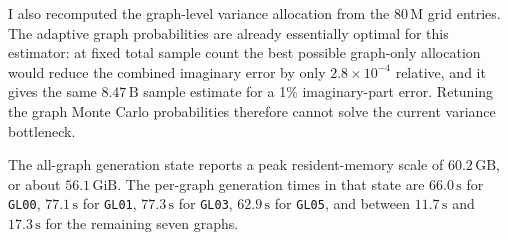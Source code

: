\documentclass[11pt]{article}
\begin{document}
I also recomputed the graph-level variance allocation from the \(80\,\mathrm{M}\)
grid entries.  The adaptive graph probabilities are already essentially
optimal for this estimator: at fixed total sample count the best possible
graph-only allocation would reduce the combined imaginary error by only
\(2.8\times10^{-4}\) relative, and it gives the same \(8.47\,\mathrm{B}\)
sample estimate for a 1\% imaginary-part error.  Retuning the graph Monte Carlo
probabilities therefore cannot solve the current variance bottleneck.

The all-graph generation state reports a peak resident-memory scale of
\(60.2\,\mathrm{GB}\), or about \(56.1\,\mathrm{GiB}\).  The per-graph
generation times in that state are \(66.0\,\mathrm{s}\) for \texttt{GL00},
\(77.1\,\mathrm{s}\) for \texttt{GL01}, \(77.3\,\mathrm{s}\) for
\texttt{GL03}, \(62.9\,\mathrm{s}\) for \texttt{GL05}, and between
\(11.7\,\mathrm{s}\) and \(17.3\,\mathrm{s}\) for the remaining seven graphs.
\end{document}
